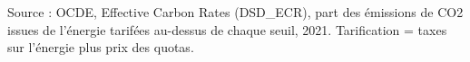 Source : OCDE, Effective Carbon Rates (DSD\_ECR), part des émissions de CO2 issues de l'énergie tarifées au-dessus de chaque seuil, 2021. Tarification = taxes sur l'énergie plus prix des quotas.
